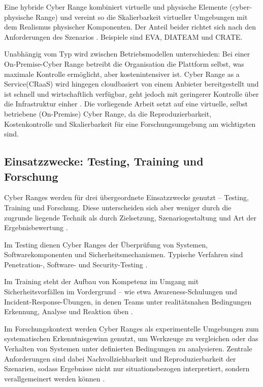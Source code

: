Eine hybride Cyber Range kombiniert virtuelle und physische Elemente (cyber-physische
Range) und vereint so die Skalierbarkeit virtueller Umgebungen mit dem Realismus physischer
Komponenten. Der Anteil beider richtet sich nach den Anforderungen des Szenarios
\cite[47]{IntroductionCyberRanges2022}. Beispiele sind EVA, DIATEAM und CRATE.

Unabhängig vom Typ wird zwischen Betriebsmodellen unterschieden: Bei einer On-Premise-Cyber
Range betreibt die Organisation die Plattform selbst, was maximale Kontrolle ermöglicht, aber
kostenintensiver ist. Cyber Range as a Service(CRaaS) wird hingegen cloudbasiert von einem
Anbieter bereitgestellt und ist schnell und wirtschaftlich verfügbar, geht jedoch mit geringerer
Kontrolle über die Infrastruktur einher \cite[63]{IntroductionCyberRanges2022}. Die vorliegende
Arbeit setzt auf eine virtuelle, selbst betriebene (On-Premise) Cyber Range, da die
Reproduzierbarkeit, Kostenkontrolle und Skalierbarkeit für eine Forschungsumgebung am wichtigsten sind. 

\subsection{Einsatzzwecke: Testing, Training und Forschung}
\label{subsec:cr-einsatzzwecke}

Cyber Ranges werden für drei übergeordnete Einsatzzwecke genutzt -- Testing, Training und
Forschung. Diese unterscheiden sich aber weniger durch die zugrunde liegende Technik als durch Zielsetzung,
Szenariogestaltung und Art der Ergebnisbewertung \cite[67]{IntroductionCyberRanges2022}\cite{Chouliaras2021}.

Im Testing dienen Cyber Ranges der Überprüfung von Systemen, Softwarekomponenten und
Sicherheitsmechanismen. Typische Verfahren sind Penetration-, Software- und Security-Testing \cite[67--72]{IntroductionCyberRanges2022}. 

Im Training steht der Aufbau von Kompetenz im Umgang mit Sicherheitsvorfällen im
Vordergrund -- wie etwa Awareness-Schulungen und Incident-Response-Übungen, in denen Teams unter
realitätsnahen Bedingungen Erkennung, Analyse und Reaktion üben \cite[72]{IntroductionCyberRanges2022}.

Im Forschungskontext werden Cyber Ranges als experimentelle Umgebungen zum systematischen
Erkenntnisgewinn genutzt, um Werkzeuge zu vergleichen oder das Verhalten von Systemen unter
definierten Bedingungen zu analysieren. Zentrale Anforderungen sind dabei Nachvollziehbarkeit und
Reproduzierbarkeit der Szenarien, sodass Ergebnisse nicht nur situationsbezogen interpretiert,
sondern verallgemeinert werden können \cite[76--78]{IntroductionCyberRanges2022}\cite{Chouliaras2021,Yamin2020CyberRanges}.

